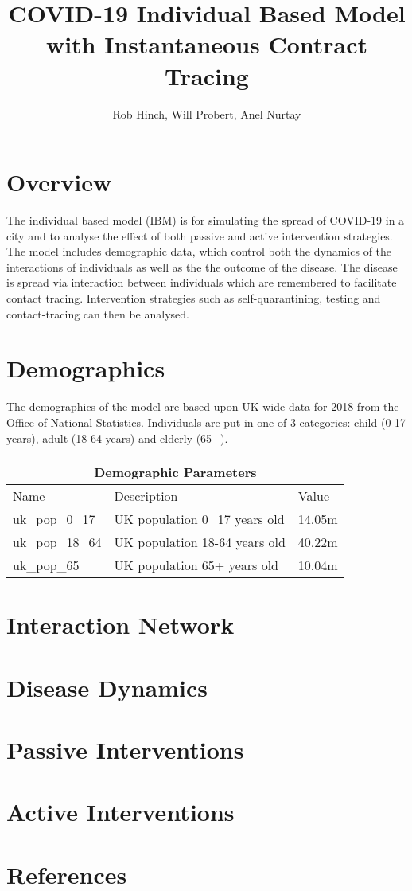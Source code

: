 \documentclass[11pt, oneside]{amsart}   	%
\title{COVID-19 Individual Based Model  with Instantaneous Contract Tracing}
\author{Rob Hinch, Will Probert, Anel Nurtay}
\begin{document}
\maketitle

\section{Overview}
The individual based model (IBM) is for simulating the spread of COVID-19 in a city and to analyse the effect of both passive and active intervention strategies.
The model includes demographic data, which control both the dynamics of the interactions of individuals as well as the the outcome of the disease.
The disease is spread via interaction between individuals which are remembered to facilitate contact tracing.
Intervention strategies such as self-quarantining, testing and contact-tracing can then be analysed.

\section{Demographics}

The demographics of the model are based upon UK-wide data for 2018 from the Office of National Statistics. 
Individuals are put in one of 3 categories: child (0-17 years), adult (18-64 years) and elderly (65+).

\medskip \medskip \medskip
\begin{tabular}{ |p{4cm}||p{7cm}|p{1cm}|  }
 \hline
 \multicolumn{3}{|c|}{Demographic Parameters} \\
 \hline
 Name   & Description & Value \\
 \hline
 \hline 
uk_pop_0_17    & UK population 0_17 years old     & 14.05m \\
uk_pop_18_64  & UK population 18-64 years old   & 40.22m \\
uk_pop_65        & UK population 65+ years old      & 10.04m \\
 \hline
\end{tabular}


\section{Interaction Network}

\section{Disease Dynamics}

\section{Passive Interventions}

\section{Active Interventions}

\section{References}
\end{document}
